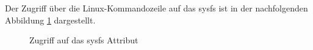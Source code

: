Der Zugriff über die Linux-Kommandozeile auf das sysfs ist in der nachfolgenden Abbildung \ref{pic:sysfs_zugriff} dargestellt.

\begin{figure}[H]
  \centering
  \caption{Zugriff auf das sysfs Attribut}
  \label{pic:sysfs_zugriff}
\end{figure}



